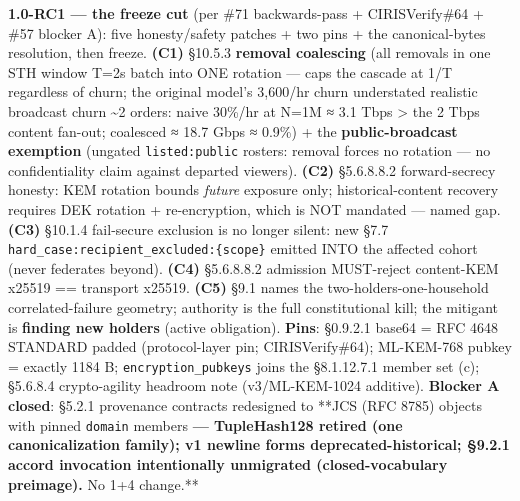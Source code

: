 \documentclass[10pt]{article}
\begin{document}
\textbf{1.0-RC1 — the freeze cut} (per \#71 backwards-pass + CIRISVerify\#64 + \#57 blocker A): five honesty/safety patches + two pins + the canonical-bytes resolution, then freeze. \textbf{(C1)} §10.5.3 \textbf{removal coalescing} (all removals in one STH window T=2s batch into ONE rotation — caps the cascade at 1/T regardless of churn; the original model's 3,600/hr churn understated realistic broadcast churn \textasciitilde{}2 orders: naive 30\%/hr at N=1M ≈ 3.1 Tbps > the 2 Tbps content fan-out; coalesced ≈ 18.7 Gbps ≈ 0.9\%) + the \textbf{public-broadcast exemption} (ungated \texttt{listed:public} rosters: removal forces no rotation — no confidentiality claim against departed viewers). \textbf{(C2)} §5.6.8.8.2 forward-secrecy honesty: KEM rotation bounds \textit{future} exposure only; historical-content recovery requires DEK rotation + re-encryption, which is NOT mandated — named gap. \textbf{(C3)} §10.1.4 fail-secure exclusion is no longer silent: new §7.7 \texttt{hard\_case:recipient\_excluded:\{scope\}} emitted INTO the affected cohort (never federates beyond). \textbf{(C4)} §5.6.8.8.2 admission MUST-reject content-KEM x25519 == transport x25519. \textbf{(C5)} §9.1 names the two-holders-one-household correlated-failure geometry; authority is the full constitutional kill; the mitigant is \textbf{finding new holders} (active obligation). \textbf{Pins}: §0.9.2.1 base64 = RFC 4648 STANDARD padded (protocol-layer pin; CIRISVerify\#64); ML-KEM-768 pubkey = exactly 1184 B; \texttt{encryption\_pubkeys} joins the §8.1.12.7.1 member set (c); §5.6.8.4 crypto-agility headroom note (v3/ML-KEM-1024 additive). \textbf{Blocker A closed}: §5.2.1 provenance contracts redesigned to **JCS (RFC 8785) objects with pinned \texttt{domain} members\textbf{ — TupleHash128 retired (one canonicalization family); v1 newline forms deprecated-historical; §9.2.1 accord invocation intentionally unmigrated (closed-vocabulary preimage). }No 1+4 change.**
\end{document}

